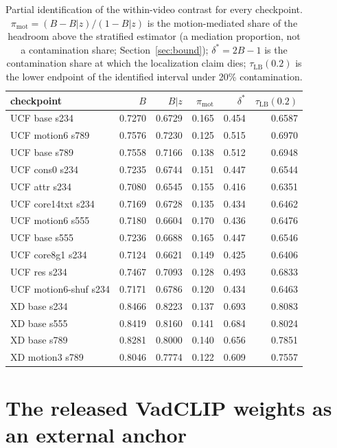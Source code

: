 \documentclass[number,preprint,12pt]{elsarticle}
\begin{document}
\begin{table}[t]
\centering
\caption{Partial identification of the within-video contrast for every
checkpoint.  $\pi_{\mathrm{mot}} = (B-B|z)/(1-B|z)$ is the
motion-mediated share of the headroom above the stratified estimator (a
mediation proportion, not a contamination share; Section~\ref{sec:bound});
$\delta^{*} = 2B-1$ is the contamination share at which the localization claim
dies; $\tau_{\mathrm{LB}}(0.2)$ is the lower endpoint of the identified interval
under 20\% contamination.}
\label{tab:partial}
\footnotesize
\begin{tabular}{@{}lrrrrr@{}}
\toprule
checkpoint & $B$ & $B|z$ & $\pi_{\mathrm{mot}}$ & $\delta^{*}$ & $\tau_{\mathrm{LB}}(0.2)$ \\
\midrule
UCF base s234          & 0.7270 & 0.6729 & 0.165 & 0.454 & 0.6587 \\
UCF motion6 s789       & 0.7576 & 0.7230 & 0.125 & 0.515 & 0.6970 \\
UCF base s789          & 0.7558 & 0.7166 & 0.138 & 0.512 & 0.6948 \\
UCF cons0 s234         & 0.7235 & 0.6744 & 0.151 & 0.447 & 0.6544 \\
UCF attr s234          & 0.7080 & 0.6545 & 0.155 & 0.416 & 0.6351 \\
UCF core14txt s234     & 0.7169 & 0.6728 & 0.135 & 0.434 & 0.6462 \\
UCF motion6 s555       & 0.7180 & 0.6604 & 0.170 & 0.436 & 0.6476 \\
UCF base s555          & 0.7236 & 0.6688 & 0.165 & 0.447 & 0.6546 \\
UCF core8g1 s234       & 0.7124 & 0.6621 & 0.149 & 0.425 & 0.6406 \\
UCF res s234           & 0.7467 & 0.7093 & 0.128 & 0.493 & 0.6833 \\
UCF motion6-shuf s234  & 0.7171 & 0.6786 & 0.120 & 0.434 & 0.6463 \\
\midrule
XD base s234           & 0.8466 & 0.8223 & 0.137 & 0.693 & 0.8083 \\
XD base s555           & 0.8419 & 0.8160 & 0.141 & 0.684 & 0.8024 \\
XD base s789           & 0.8281 & 0.8000 & 0.140 & 0.656 & 0.7851 \\
XD motion3 s789        & 0.8046 & 0.7774 & 0.122 & 0.609 & 0.7557 \\
\bottomrule
\end{tabular}
\end{table}

\section{The released VadCLIP weights as an external anchor}\label{sec:appD}
\end{document}
